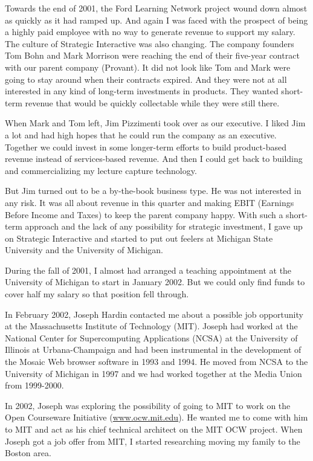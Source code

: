 \documentclass[12pt]{book}
\begin{document}
Towards the end of 2001, the Ford Learning Network project
wound down almost as quickly as it had ramped up.
And again I was faced with the prospect of being a highly paid employee
with no way to generate revenue to support my salary.
The culture of Strategic Interactive
was also changing.  The company founders Tom Bohn and Mark Morrison
were reaching the end of their five-year contract with
our parent company (Provant).
It did not look like Tom and Mark were going to stay around when their
contracts expired.  And they were not at all interested in any kind
of long-term investments in products.  They wanted short-term revenue
that would be quickly collectable while they were still there.

When Mark and Tom left, Jim Pizzimenti took over as
our executive.  I liked Jim a lot and had high hopes that he could
run the company as an executive.  Together we could invest in
some longer-term efforts to build product-based revenue instead
of services-based revenue.  And then I could get back to building and
commercializing my lecture capture technology.

But Jim turned out to be a by-the-book business type.  He was not
interested in any risk.  It was all about revenue in this quarter
and making EBIT (Earnings Before Income and Taxes) to keep the parent
company happy.
With such a short-term approach and the lack of any
possibility for strategic investment,
I gave up on Strategic Interactive and started to put out
feelers at Michigan State University and the University of Michigan.

During the fall of 2001, I almost had arranged a teaching appointment
at the University of Michigan to start in January 2002.
But we could only find funds to cover half my salary so that position
fell through.

In February 2002, Joseph Hardin contacted me about a possible job
opportunity at the Massachusetts Institute of Technology (MIT).
Joseph had worked at the National Center for Supercomputing Applications
(NCSA) at the University of Illinois at Urbana-Champaign
and had been instrumental in the development of the Mosaic Web browser
software in 1993 and 1994.  He moved from NCSA to the University of
Michigan in 1997 and we had worked together at the Media Union
from 1999-2000.

In 2002, Joseph was exploring the possibility of going to MIT to work on the
Open Courseware Initiative (\url{www.ocw.mit.edu}).  He wanted me to
come with him to MIT and act as his chief technical architect on
the MIT OCW project.  When Joseph got a job offer from MIT, I started
researching moving my family to the Boston area.
\end{document}
